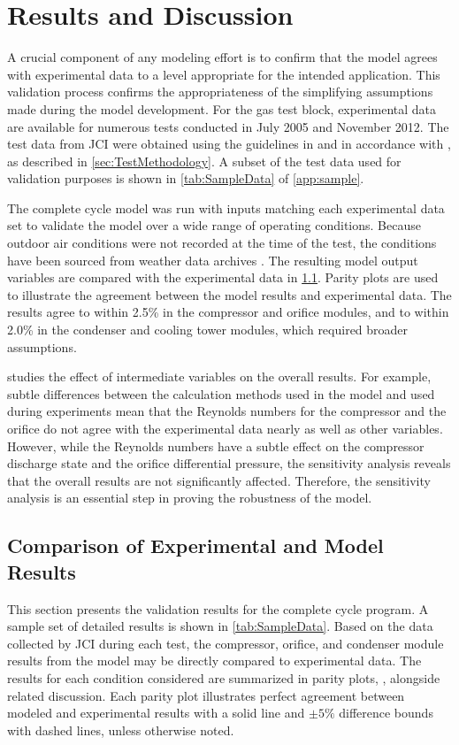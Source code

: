 \chapter{Results and Discussion} \label{cha:results}
A crucial component of any modeling effort is to confirm
that the model agrees with experimental data to a level
appropriate for the intended application.
This validation process confirms the appropriateness of the simplifying
assumptions made during the model development.
For the  gas test block, experimental data are available for 
numerous tests conducted in July 2005 and November 2012.
The test data from JCI were obtained using the guidelines
in \textcite{bluebook} and in accordance with \textcite{ptc10},
as described in \cref{sec:TestMethodology}.
A subset of the test data used for validation purposes
is shown in \cref{tab:SampleData} of \cref{app:sample}.

The complete cycle model
was run with inputs matching each experimental data set
to validate the model over a wide range of operating conditions.
Because outdoor air conditions were not recorded at the time of the test,
the conditions have been sourced from weather data archives \parencite{wunder2005,wunder2012}.
The resulting model output variables are compared with the
experimental data in \cref{sec:expresults}.
Parity plots are used to illustrate the agreement 
between the model results and experimental data.
The results agree to within 2.5\% in the compressor and orifice modules,
and to within 2.0\% in the condenser and cooling tower modules,
which required broader assumptions.

 studies the effect of intermediate
variables on the overall results.
For example, subtle differences between the calculation methods used
in the model and used during experiments mean that the Reynolds numbers
for the compressor and the orifice
do not agree with the experimental data nearly as well
as other variables.
However, while the Reynolds numbers have a subtle effect on the 
compressor discharge state and the orifice
differential pressure, the sensitivity analysis
reveals that the overall results are not significantly affected.
Therefore, the sensitivity analysis is an essential step in
proving the robustness of the model.

\section{Comparison of Experimental and Model Results} \label{sec:expresults}
This section presents the validation results for the complete cycle program.
A sample set of detailed results is shown in \cref{tab:SampleData}.
Based on the data collected by JCI during each test, the compressor,
orifice, and condenser module results from the model may be directly compared
to experimental data.
The results for each condition considered are summarized in 
parity plots, ,
alongside related discussion.
Each parity plot illustrates perfect agreement between  modeled 
and experimental results with a solid line and $\pm 5\%$
difference bounds with dashed lines, unless otherwise noted.

